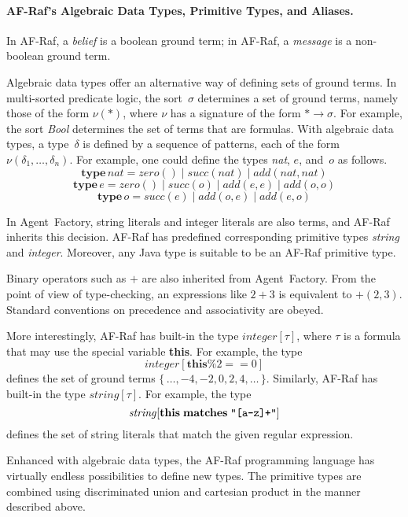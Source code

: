 \documentclass[a4paper,12pt,oneside,fleqn]{book} %
\begin{document}
\paragraph{AF-Raf's Algebraic Data Types, Primitive Types, and Aliases.}

In AF-Raf, a \emph{belief} is a boolean ground term; in AF-Raf, a
\emph{message} is a non-boolean ground term.

Algebraic data types offer an alternative way of defining sets of ground
terms. In multi-sorted predicate logic, the sort~$\sigma$ determines a set
of ground terms, namely those of the form $\nu(*)$, where $\nu$ has a
signature of the form $*\to\sigma$.  For example, the sort \textit{Bool}
determines the set of terms that are formulas.  With algebraic data types,
a type~$\delta$ is defined by a sequence of patterns, each of the form
$\nu(\delta_1,\ldots,\delta_n)$. For example, one could define the types
\textit{nat}, $e$, and~$o$ as follows.
\[\mathbf{type}\,\mathit{nat} =
  \mathit{zero}()
  \mid\mathit{succ}(\mathit{nat})
  \mid\mathit{add}(\mathit{nat},\mathit{nat})\]
\[\mathbf{type}\,e =
  \mathit{zero}()
  \mid\mathit{succ}(o)
  \mid\mathit{add}(e,e)
  \mid\mathit{add}(o,o)\]
\[\mathbf{type}\,o =
  \mathit{succ}(e)
  \mid\mathit{add}(o,e)
  \mid\mathit{add}(e,o)\]

In Agent~Factory, string literals and integer literals are
also terms, and AF-Raf inherits this decision. AF-Raf has
predefined corresponding primitive types \textit{string} and
\textit{integer}. Moreover, any Java type is suitable to be an AF-Raf
primitive type.

Binary operators such as $+$ are also inherited from Agent~Factory. From
the point of view of type-checking, an expressions like $2+3$ is equivalent
to $+(2,3)$. Standard conventions on precedence and associativity are
obeyed.

More interestingly, AF-Raf has built-in the type $\mathit{integer}[\tau]$,
where $\tau$ is a formula that may use the special variable \textbf{this}.
For example, the type \[\mathit{integer}[\mathbf{this}\%2==0]\] defines the
set of ground terms $\{\,\ldots,-4,-2,0,2,4,\ldots\,\}$. Similarly, AF-Raf
has built-in the type $\mathit{string}[\tau]$. For example, the type
\[\mathit{string}[\mathbf{this}\;\mathbf{matches}\;\verb|"[a-z]+"|]\]
defines the set of string literals that match the given regular expression.

Enhanced with algebraic data types, the AF-Raf programming language has
virtually endless possibilities to define new types. The primitive types
are combined using discriminated union and cartesian product in the manner
described above.
\end{document}
